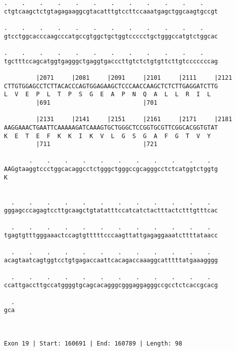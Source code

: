 \documentclass{article}
\begin{document}
\begin{Verbatim}
.    .    .    .    .    .    .    .    .    .    .    .    
ctgtcaagctctgtagagaaggcgtacatttgtccttccaaatgagctggcaagtgccgt
                                                            
.    .    .    .    .    .    .    .    .    .    .    .    
gtcctggcacccaagcccatgccgtggctgctggtccccctgctgggccatgtctggcac
                                                            
.    .    .    .    .    .    .    .    .    .    .    .    
tgctttccagcatggtgagggctgaggtgacccttgtctctgtgttcttgtcccccccag
                                                            
         |2071     |2081     |2091     |2101     |2111     |2121
CTTGTGGAGCCTCTTACACCCAGTGGAGAAGCTCCCAACCAAGCTCTCTTGAGGATCTTG
L  V  E  P  L  T  P  S  G  E  A  P  N  Q  A  L  L  R  I  L  
         |691                          |701                 
  
         |2131     |2141     |2151     |2161     |2171     |2181
AAGGAAACTGAATTCAAAAAGATCAAAGTGCTGGGCTCCGGTGCGTTCGGCACGGTGTAT
K  E  T  E  F  K  K  I  K  V  L  G  S  G  A  F  G  T  V  Y  
         |711                          |721                 
  
       .    .    .    .    .    .    .    .    .    .    .  
AAGgtaaggtccctggcacaggcctctgggctgggccgcagggcctctcatggtctggtg
K                                                           
                                                            
  
  .    .    .    .    .    .    .    .    .    .    .    .  
gggagcccagagtccttgcaagctgtatatttccatcatctactttactctttgtttcac
                                                            
  .    .    .    .    .    .    .    .    .    .    .    .  
tgagtgtttgggaaactccagtgtttttcccaagttattgagaggaaatcttttataacc
                                                            
  .    .    .    .    .    .    .    .    .    .    .    .  
acagtaatcagtggtcctgtgagaccaattcacagaccaaaggcatttttatgaaagggg
                                                            
  .    .    .    .    .    .    .    .    .    .    .    .  
ccattgaccttgccatggggtgcagcacagggcgggaggagggccgcctctcaccgcacg
                                                            
  .
gca
   
   
 
Exon 19 | Start: 160691 | End: 160789 | Length: 98




\end{Verbatim}
\end{document}
